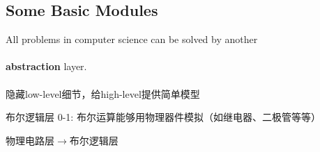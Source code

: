 \documentclass[UTF8]{ctexbeamer}
\begin{document}
\subsection{Some Basic Modules}
\begin{frame}
\subsectionpage
\end{frame}

\begin{frame}
\begin{center}
All problems in computer science can be solved by another\\
\quad\\
{\textbf{\huge{abstraction}}} layer.\\
\quad\\
隐藏low-level细节，给high-level提供简单模型
\end{center}
\end{frame}

\begin{frame}{布尔逻辑层}
0-1: 布尔运算能够用物理器件模拟（如继电器、二极管等等）
\pause
\begin{center}
物理电路层$\to$布尔逻辑层
\end{center}
\end{frame}
\end{document}
